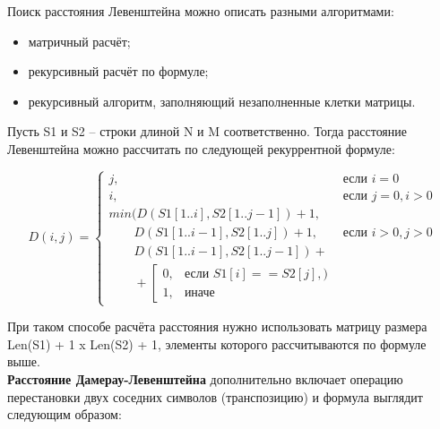 \documentclass[12pt]{report}
\begin{document}
Поиск расстояния Левенштейна можно описать разными алгоритмами:
\begin{itemize}
\item матричный расчёт;
\item рекурсивный расчёт по формуле;
\item рекурсивный алгоритм, заполняющий незаполненные клетки матрицы.
\end{itemize}

Пусть S1 и S2 – строки длиной N и M соответственно. Тогда расстояние Левенштейна можно рассчитать по следующей рекуррентной формуле:

\begin{equation}
D(i,j) = \left\{ \begin{array}{ll}
 j, & \textrm{$\mbox{если }i = 0$}\\
 i, & \textrm{$\mbox{если }j = 0, i > 0$}\\
min(D(S1[1..i], S2[1.. j - 1])+1,\\
\qquad D(S1[1..i - 1], S2[1..j]) + 1, &\textrm{$\mbox{если }i>0, j>0$}\\
\qquad D(S1[1..i - 1], S2[1..j - 1]) + \\
\qquad+\left[ 
	\begin{array}{ccc}
	0, & \textrm{$\mbox{если }S1[i] == S2[j],)$}\\
	1, & \textrm{иначе}
	\end{array} 
\right.
  \end{array} \right.
\end{equation}

При таком способе расчёта расстояния нужно использовать матрицу размера Len(S1) + 1 x Len(S2) + 1, элементы которого рассчитываются по формуле выше.\\



\textbf{Расстояние Дамерау-Левенштейна} дополнительно включает операцию перестановки двух соседних символов (транспозицию) и формула выглядит следующим образом:
\end{document}
